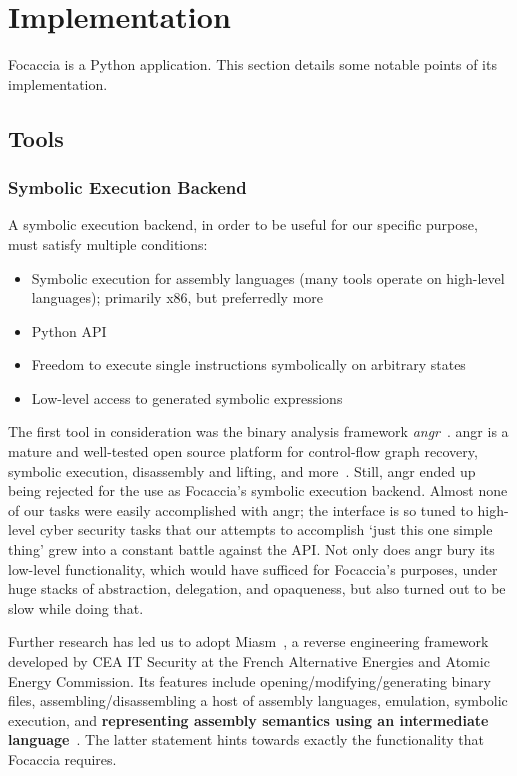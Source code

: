 \chapter{Implementation}\label{chapter:implementation}

Focaccia is a Python application. This section details some notable points of its implementation.

\section{Tools}

\subsection{Symbolic Execution Backend}

A symbolic execution backend, in order to be useful for our specific purpose, must satisfy multiple conditions:

\begin{itemize}
    \item Symbolic execution for assembly languages (many tools operate on high-level languages); primarily x86, but
        preferredly more
    \item Python API
    \item Freedom to execute single instructions symbolically on arbitrary states
    \item Low-level access to generated symbolic expressions
\end{itemize}

The first tool in consideration was the binary analysis framework \textit{angr}~\cite{shoshitaishvili2016state}. angr is
a mature and well-tested open source platform for control-flow graph recovery, symbolic execution, disassembly and
lifting, and more~\cite{AngrWebsite2024Mar}. Still, angr ended up being rejected for the use as Focaccia's symbolic
execution backend. Almost none of our tasks were easily accomplished with angr; the interface is so tuned to high-level
cyber security tasks that our attempts to accomplish `just this one simple thing' grew into a constant battle against
the API\@. Not only does angr bury its low-level functionality, which would have sufficed for Focaccia's purposes, under
huge stacks of abstraction, delegation, and opaqueness, but also turned out to be slow while doing that.

Further research has led us to adopt Miasm~\cite{desclaux2012miasm}, a reverse engineering framework developed by CEA IT
Security at the French Alternative Energies and Atomic Energy Commission. Its features include
opening/modifying/generating binary files, assembling/disassembling a host of assembly languages, emulation, symbolic
execution, and \textbf{representing assembly semantics using an intermediate language}~\cite{cea-sec2024Mar}. The latter
statement hints towards exactly the functionality that Focaccia requires.

